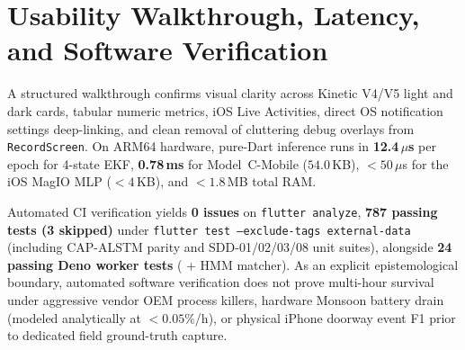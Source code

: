 \begin{table}[htbp]
\centering
\caption{STAGA Stop/Trip Benchmark ($122{,}808$ Epochs) \& Polyline Compression ($30{,}381$ Pts).}
\label{tab:staga_dbscan_benchmark}
\end{table}

\section{Usability Walkthrough, Latency, and Software Verification}
\label{sec:eval_verification}
A structured walkthrough confirms visual clarity across Kinetic V4/V5 light and dark cards, tabular numeric metrics, iOS Live Activities, direct OS notification settings deep-linking, and clean removal of cluttering debug overlays from \texttt{RecordScreen}. On ARM64 hardware, pure-Dart inference runs in \textbf{12.4\,$\mu$s} per epoch for 4-state EKF, \textbf{0.78\,ms} for Model~C-Mobile ($54.0$\,KB), $<50$\,$\mu$s for the iOS MagIO MLP ($<4$\,KB), and $<1.8$\,MB total RAM.

Automated CI verification yields \textbf{0 issues} on \texttt{flutter analyze}, \textbf{787 passing tests (3 skipped)} under \texttt{flutter test --exclude-tags external-data} (including CAP-ALSTM parity and SDD-01/02/03/08 unit suites), alongside \textbf{24 passing Deno worker tests} ( +  HMM matcher). As an explicit epistemological boundary, automated software verification does not prove multi-hour survival under aggressive vendor OEM process killers, hardware Monsoon battery drain (modeled analytically at $<0.05\%$/h), or physical iPhone doorway event F1 prior to dedicated field ground-truth capture.

